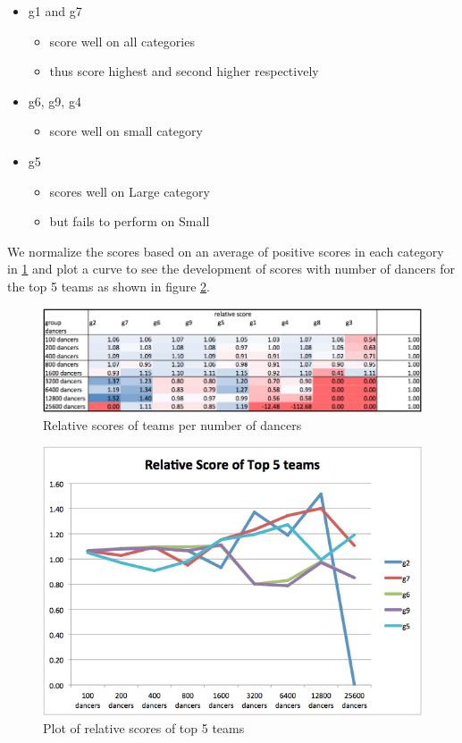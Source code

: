 \begin{itemize}
\tightlist
\item
  g1 and g7

  \begin{itemize}
  \tightlist
  \item
    score well on all categories
  \item
    thus score highest and second higher respectively
  \end{itemize}
\item
  g6, g9, g4

  \begin{itemize}
  \tightlist
  \item
    score well on small category
  \end{itemize}
\item
  g5

  \begin{itemize}
  \tightlist
  \item
    scores well on Large category
  \item
    but fails to perform on Small
  \end{itemize}
\end{itemize}

We normalize the scores based on an average of positive scores in each
category in \ref{team-rel} and plot a curve to see the development of
scores with number of dancers for the top 5 teams as shown in figure
\ref{team-5-rel}.

\begin{figure}[htbp]
\centering
\includegraphics{imgs/team-rel.png}
\caption{Relative scores of teams per number of dancers\label{team-rel}}
\end{figure}

\begin{figure}[htbp]
\centering
\includegraphics{imgs/team-5-rel.png}
\caption{Plot of relative scores of top 5 teams\label{team-5-rel}}
\end{figure}

